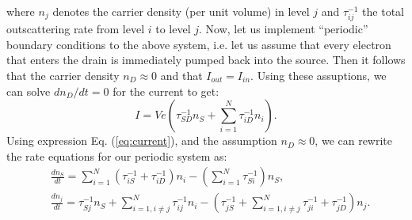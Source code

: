 \documentclass[10pt,letterpaper]{article}
\begin{document}
where  $n_j$ denotes the carrier density (per unit volume) in level $j$ and $\tau_{ij}^{-1}$ the total outscattering rate from level $i$ to level $j$. Now, let us implement ``periodic'' boundary conditions to the above system, i.e. let us assume that every electron that enters the drain is immediately pumped back into the source. Then it follows that the carrier density $n_D \approx 0$ and that $I_{out} = I_{in}$. Using these assuptions, we can solve $dn_D/dt = 0$  for the current to get:
\begin{equation}
\label{eq:current}
I = Ve\left(\tau_{SD}^{-1} n_S +   \sum_{i=1}^{N} \tau_{iD}^{-1}n_i\right). 
\end{equation}
Using expression Eq. (\ref{eq:current}), and the assumption $n_D \approx 0$, we can rewrite the rate equations for our periodic system as:
\begin{align}
& \frac{d n_S} {dt } =  \sum_{i=1}^{N} \left( \tau_{iS}^{-1} + \tau_{iD}^{-1} \right) n_i  - \left( \sum_{i=1}^N \tau_{Si}^{-1} \right) n_S, \nonumber \\
& \frac{d n_j} {dt } = \tau_{Sj}^{-1} n_S +   \sum_{i=1 , i\neq j}^{N} \tau_{ij}^{-1}n_i  - \left(  \tau_{jS}^{-1}  + \sum_{i=1 , i\neq j}^N \tau_{ji}^{-1}  + \tau_{jD}^{-1}\right) n_j. \label{eq:periodicreateequations}
\end{align} 
\end{document}
